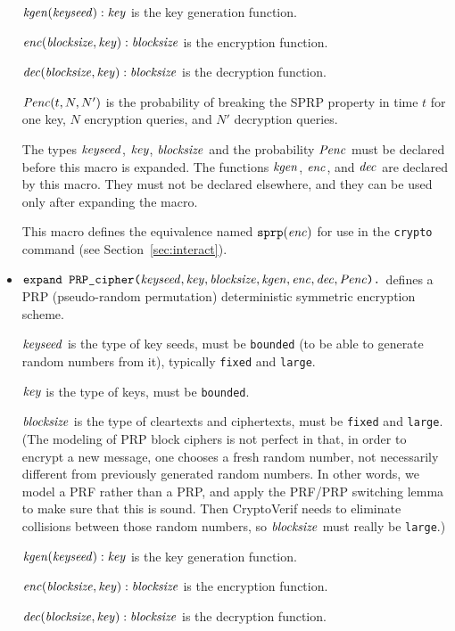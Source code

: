 \documentclass{article}
\begin{document}
\begin{itemize}
   $\mathit{kgen}(\mathit{keyseed}): \mathit{key}$ is the key generation function.

   $\mathit{enc}(\mathit{blocksize}, \mathit{key}): \mathit{blocksize}$ is the encryption function.

   $\mathit{dec}(\mathit{blocksize}, \mathit{key}): \mathit{blocksize}$ is the
  decryption function.

  $\mathit{Penc}(t, N, N')$ is the probability of breaking the SPRP
  property in time $t$ for one key, $N$ encryption queries, and $N'$
  decryption queries.

  The types $\mathit{keyseed}$, $\mathit{key}$, $\mathit{blocksize}$ and the
  probability $\mathit{Penc}$ must be declared before this macro is
  expanded. The functions $\mathit{kgen}$, $\mathit{enc}$, and $\mathit{dec}$ are
  declared by this macro. They must not be declared elsewhere, and
  they can be used only after expanding the macro.

   This macro defines the equivalence named $\texttt{sprp}(\mathit{enc})$
   for use in the \texttt{crypto} command 
   (see Section~\ref{sec:interact}).

\item $\texttt{expand PRP\_cipher(}\mathit{keyseed}, \mathit{key},
  \mathit{blocksize}, \mathit{kgen}, \mathit{enc}, \mathit{dec}, \mathit{Penc}\texttt{).}$
  defines a PRP (pseudo-random permutation) deterministic
  symmetric encryption scheme.

   $\mathit{keyseed}$ is the type of key seeds, must be \texttt{bounded} (to be able to generate random numbers from it), typically \texttt{fixed} and \texttt{large}.

   $\mathit{key}$ is the type of keys, must be \texttt{bounded}.

   $\mathit{blocksize}$ is the type of cleartexts and ciphertexts, must be
   \texttt{fixed} and \texttt{large}.
   (The modeling of PRP block ciphers is not perfect in that, in order
   to encrypt a new message, one chooses a fresh random number, not
   necessarily different from previously generated random numbers. In
   other words, we model a PRF rather than a PRP, and apply the
   PRF/PRP switching lemma to make sure that this is sound. Then
   CryptoVerif needs to eliminate collisions between those random
   numbers, so $\mathit{blocksize}$ must really be \texttt{large}.)

   $\mathit{kgen}(\mathit{keyseed}): \mathit{key}$ is the key generation function.

   $\mathit{enc}(\mathit{blocksize}, \mathit{key}): \mathit{blocksize}$ is the encryption function.

   $\mathit{dec}(\mathit{blocksize}, \mathit{key}): \mathit{blocksize}$ is the
  decryption function.


\end{itemize}
\end{document}
